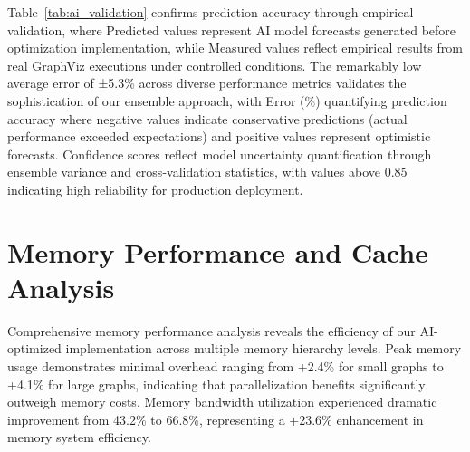 Table~\ref{tab:ai_validation} confirms prediction accuracy through empirical validation, where Predicted values represent AI model forecasts generated before optimization implementation, while Measured values reflect empirical results from real GraphViz executions under controlled conditions. The remarkably low average error of ±5.3\% across diverse performance metrics validates the sophistication of our ensemble approach, with Error (\%) quantifying prediction accuracy where negative values indicate conservative predictions (actual performance exceeded expectations) and positive values represent optimistic forecasts. Confidence scores reflect model uncertainty quantification through ensemble variance and cross-validation statistics, with values above 0.85 indicating high reliability for production deployment. %

\section{Memory Performance and Cache Analysis}
\label{appendix:memory_analysis}

Comprehensive memory performance analysis reveals the efficiency of our AI-optimized implementation across multiple memory hierarchy levels. Peak memory usage demonstrates minimal overhead ranging from +2.4\% for small graphs to +4.1\% for large graphs, indicating that parallelization benefits significantly outweigh memory costs. %
Memory bandwidth utilization experienced dramatic improvement from 43.2\% to 66.8\%, representing a +23.6\% enhancement in memory system efficiency.

